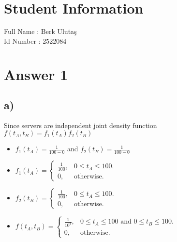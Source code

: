 \documentclass[12pt]{article}
\begin{document}
\section*{Student Information } 
Full Name : Berk Ulutaş \\
Id Number : 2522084 \\

\section*{Answer 1}

\subsection*{a)}
Since servers are independent joint density function $f(t_A, t_B) = f_1(t_A)f_2(t_B)$
\begin{itemize}
    \item $f_1(t_A) = \frac{1}{100 - 0}$ and $f_2(t_B) = \frac{1}{100 - 0}$
    \item 
    \begin{math}
      f_1(t_A)=\left\{
        \begin{array}{ll}
          \frac{1}{100}, & \mbox{$0\leq t_A \leq 100$}.\\
          0, & \mbox{otherwise}.
        \end{array}
      \right.
    \end{math}
    \item 
    \begin{math}
      f_2(t_B)=\left\{
        \begin{array}{ll}
          \frac{1}{100}, & \mbox{$0\leq t_A \leq 100$}.\\
          0, & \mbox{otherwise}.
        \end{array}
      \right.
    \end{math}
    \item 
    \begin{math}
      f(t_A,t_B)=\left\{
        \begin{array}{ll}
          \frac{1}{10^4}, & \mbox{$0 \leq t_A \leq 100$ and $0 \leq t_B \leq 100$}.\\
          0, & \mbox{otherwise}.
        \end{array}
      \right.
    \end{math}
\end{itemize}
\end{document}
